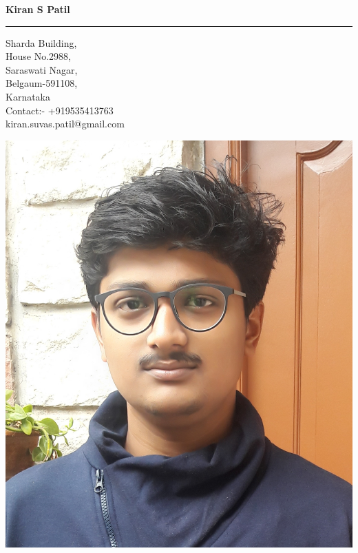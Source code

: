 \documentclass[a4paper]{article}
\begin{document}
	

	\begin{center}
		\huge{\textbf{Kiran S Patil}}
		\vspace{5pt}
		\hrule
	\end{center}
	\begin{minipage}{0.5\textwidth}
		Sharda Building,\\ 
		House No.2988,  \\
		Saraswati Nagar,\\
		Belgaum-591108,\\ 
		Karnataka \\
		Contact:- +919535413763\\
		kiran.suvas.patil@gmail.com\\
	\end{minipage}
	\begin{minipage}{0.5\textwidth}	
		\hspace{153pt}
		\includegraphics[scale=0.065]{image.jpg}		
	\end{minipage}
\end{document}
